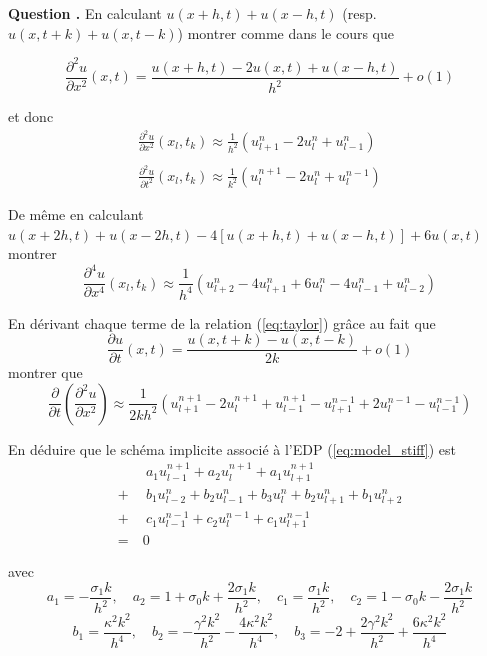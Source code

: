 \documentclass[a4,12pt]{article}
\newcounter{Nbquestion}
\newcommand*\question{%
\stepcounter{Nbquestion}%
\textbf{Question \theNbquestion. }}
\begin{document}
\begin{mdframed}[style=exampledefault]
\question En calculant $u(x+h,t)+u(x-h,t)$ (resp. $u(x,t+k)+u(x,t-k)$) montrer comme dans le cours que 

\begin{equation}
	\frac{\partial^2 u}{\partial x^2}(x,t)=\frac{u(x+h,t)-2u(x,t)+u(x-h,t)}{h^2}+o(1)
	\label{eq:taylor}
\end{equation}
 
et donc
\[
\begin{array}{l}
	\displaystyle \frac{\partial^2 u}{\partial x^2}(x_l,t_k)\approx \frac{1}{h^2}(u_{l+1}^n-2u_l^n+u_{l-1}^n)\\ \\ 		\displaystyle \frac{\partial^2 u}{\partial t^2}(x_l,t_k)\approx \frac{1}{k^2}(u_{l}^{n+1}-2u_l^n+u_{l}^{n-1})\end{array}
\]
 
De même en calculant $u(x+2h,t)+u(x-2h,t)-4[u(x+h,t)+u(x-h,t)]+6u(x,t)$ montrer 
\[
\frac{\partial^4 u}{\partial x^4}(x_l,t_k)\approx \frac{1}{h^4}(u_{l+2}^n-4u_{l+1}^n+6u_l^n-4u_{l-1}^n+u_{l-2}^n)
\]
 
En dérivant chaque terme de la relation (\ref{eq:taylor}) grâce au fait que 
\[
\frac{\partial u}{\partial t}(x,t)=\frac{u(x,t+k)-u(x,t-k)}{2k}+o(1)
\]
montrer que 
\[
\frac{\partial}{\partial t}\left(\frac{\partial^2 u}{\partial x^2}\right)\approx \frac{1}{2kh^2}(u_{l+1}^{n+1}-2u_{l}^{n+1}+u_{l-1}^{n+1}-u_{l+1}^{n-1}+2u_l^{n-1}-u_{l-1}^{n-1})
\]
 
En déduire que le schéma implicite associé à l'EDP (\ref{eq:model_stiff}) est 
\begin{align}
	&~~a_1u_{l-1}^{n+1}+a_2u_l^{n+1}+a_1u_{l+1}^{n+1}\\
	+& ~~b_1u_{l-2}^n+b_2u_{l-1}^n+b_3u_l^n+b_2u_{l+1}^n+b_1u_{l+2}^n\\ 
	+&~~ c_1u_{l-1}^{n-1}+c_2u_l^{n-1}+c_1u_{l+1}^{n-1}\\ 
	=&~0
\end{align}

avec 
\[ 
a_1=-\frac{\sigma_1 k}{h^2},\quad a_2=1+\sigma_0 k+\frac{2\sigma_1 k}{h^2}, 
\quad c_1=\frac{\sigma_1 k}{h^2},\quad c_2=1-\sigma_0 k-\frac{2\sigma_1 k}{h^2}
\]
\[
b_1=\frac{\kappa^2 k^2}{h^4}, \quad b_2=-\frac{\gamma^2 k^2}{h^2}-\frac{4\kappa^2 k^2}{h^4},
\quad b_3=-2+\frac{2\gamma^2 k^2}{h^2}+\frac{6\kappa^2 k^2}{h^4}
\]
\end{mdframed}

\end{document}
